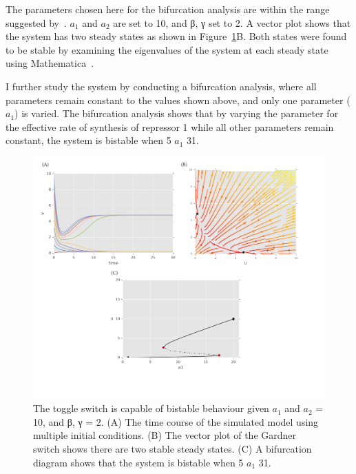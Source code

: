 The parameters chosen here for the bifurcation analysis are within the range suggested by~\textcite{Gardner:2000vha}.  $a_1$ and $a_2$ are set to 10, and β, γ set to 2. A vector plot shows that the system has two steady states as shown in Figure~\ref{fig:Gard_CS}B. Both states were found to be stable by examining the eigenvalues of the system at each steady state using Mathematica~\autocite{mathematica:2016}.


I further study the system by conducting a bifurcation analysis, where all parameters remain constant to the values shown above, and only one parameter ($a_1$) is varied. The bifurcation analysis shows that by varying the parameter for the effective rate of synthesis of repressor 1 while all other parameters remain constant, the system is bistable when 5 \ge{} $a_1$ \le{} 31.



\begin{figure}[htbp]
\centerfloat
\includegraphics[scale=0.7]{../../chapters/chapterABCSysBio/images/Gard_CS.pdf}
\caption[Phase space and bifurcation analysis of the Gardner toggle switch]{\label{fig:Gard_CS}The \textcite{Gardner:2000vha} toggle switch is capable of bistable behaviour given $a_1$ and $a_2$ = 10, and β, γ = 2. (A) The time course of the simulated model using multiple initial conditions. (B) The vector plot of the Gardner switch shows there are two stable steady states. (C) A bifurcation diagram shows that the system is bistable when 5 \ge{} $a_1$ \le{} 31.}
\end{figure}
\clearpage



